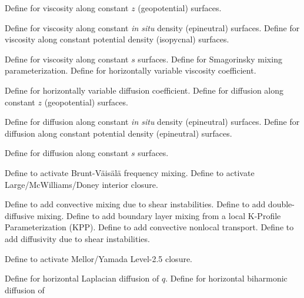 \begin{klist}
   \mbox{}
  \begin{klist}
       Define for viscosity along constant $z$
   (geopotential) surfaces.
    \begin{klist}
       Define for viscosity along constant {\em in
   situ} density (epineutral) surfaces.
       Define for viscosity along constant potential
   density (isopycnal) surfaces.
    \end{klist}
       Define for viscosity along constant $s$
   surfaces.
      Define for Smagorinsky mixing parameterization.
        Define for horizontally variable viscosity
     coefficient.
  \end{klist}
   \mbox{}
  \begin{klist}
        Define for horizontally variable diffusion
     coefficient.
       Define for diffusion along constant $z$
   (geopotential) surfaces.
    \begin{klist}
       Define for diffusion along constant {\em in
   situ} density (epineutral) surfaces.
       Define for diffusion along constant potential
   density (epineutral) surfaces.
    \end{klist}
       Define for diffusion along constant $s$
   surfaces.
  \end{klist}
   \mbox{}
  \begin{klist}
       Define to activate Brunt-V\"ais\"al\"a
   frequency mixing.
       Define to activate Large/McWilliams/Doney
   interior closure.
    \begin{klist}
       Define to add convective mixing due to shear
   instabilities.
       Define to add double-diffusive mixing.
       Define to add boundary layer mixing from a local
   K-Profile Parameterization (KPP).
      Define to add convective nonlocal transport.
       Define to add diffusivity due to shear
   instabilities.
    \end{klist}
       Define to activate Mellor/Yamada Level-2.5
   closure.
    \begin{klist}
       Define for horizontal Laplacian diffusion of
   $q$.
       Define for horizontal biharmonic diffusion of

\end{klist}
\end{klist}
\end{klist}
